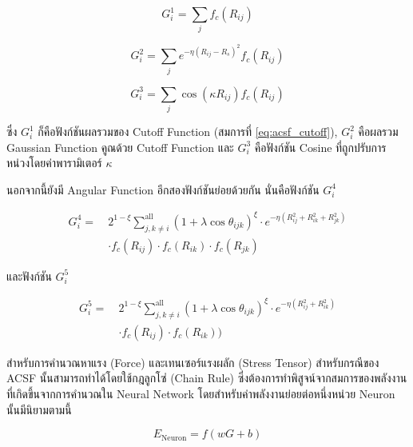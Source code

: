 \begin{equation}\label{eq:rf_g1}
    G^{1}_{i} = \sum_{j} f_{c}(R_{ij})
\end{equation}

\begin{equation}\label{eq:rf_g2}
    G^{2}_{i} = \sum_{j} e^{-\eta(R_{ij} - R_{s})^{2}} f_{c}(R_{ij})
\end{equation}

\begin{equation}\label{eq:rf_g3}
    G^{3}_{i} = \sum_{j} \cos(\kappa R_{ij}) f_{c}(R_{ij})
\end{equation}

\noindent ซึ่ง $G^{1}_{i}$ ก็คือฟังก์ชันผลรวมของ Cutoff Function (สมการที่ \eqref{eq:acsf_cutoff}), $G^{2}_{i}$ คือผลรวม Gaussian Function คูณด้วย Cutoff Function และ $G^{3}_{i}$ คือฟังก์ชัน Cosine ที่ถูกปรับการหน่วงโดยค่าพารามิเตอร์ $\kappa$

นอกจากนี้ยังมี Angular Function อีกสองฟังก์ชันย่อยด้วยกัน นั่นคือฟังก์ชัน $G^{4}_{i}$

\begin{align}\label{eq:rf_g4}
    G^{4}_{i} =~ & 2^{1 - \xi}\sum^{\text{all}}_{j,k \neq i} (1+\lambda \cos \theta_{ijk})^{\xi}
    \cdot e^{-\eta(R^{2}_{ij} + R^{2}_{ik} + R^{2}_{jk})} \nonumber                              \\
                 & \cdot f_{c}(R_{ij}) \cdot f_{c}(R_{ik}) \cdot f_{c}(R_{jk})
\end{align}

\noindent และฟังก์ชัน $G^{5}_{i}$

\begin{align}\label{eq:rf_g5}
    G^{5}_{i} =~ & 2^{1 - \xi}\sum^{\text{all}}_{j,k \neq i} (1+\lambda \cos \theta_{ijk})^{\xi}
    \cdot e^{-\eta(R^{2}_{ij} + R^{2}_{ik})} \nonumber                                           \\
                 & \cdot f_{c}(R_{ij}) \cdot f_{c}(R_{ik}))
\end{align}

สำหรับการคำนวณหาแรง (Force) และเทนเซอร์แรงผลัก (Stress Tensor) สำหรับกรณีของ ACSF นั้นสามารถทำได้โดยใช้กฎลูกโซ่ (Chain Rule) ซึ่งต้องการทำพิสูจน์จากสมการของพลังงานที่เกิดขึ้นจากการคำนวณใน Neural Network โดยสำหรับค่าพลังงานย่อยต่อหนึ่งหน่วย Neuron นั้นมีนิยามตามนี้

\begin{equation}\label{eq:acsf_sub_ener}
    E_{\text{Neuron}} = f(w G + b)
\end{equation}

